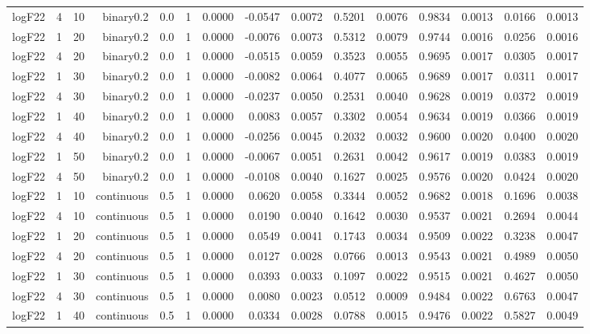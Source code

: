 \begin{longtable}{rrrrrrrrrrrrrrr}
  logF22 & 4 & 10 & binary0.2 & 0.0 & 1 & 0.0000 & -0.0547 & 0.0072 & 0.5201 & 0.0076 & 0.9834 & 0.0013 & 0.0166 & 0.0013 \\ 
  logF22 & 1 & 20 & binary0.2 & 0.0 & 1 & 0.0000 & -0.0076 & 0.0073 & 0.5312 & 0.0079 & 0.9744 & 0.0016 & 0.0256 & 0.0016 \\ 
  logF22 & 4 & 20 & binary0.2 & 0.0 & 1 & 0.0000 & -0.0515 & 0.0059 & 0.3523 & 0.0055 & 0.9695 & 0.0017 & 0.0305 & 0.0017 \\ 
  logF22 & 1 & 30 & binary0.2 & 0.0 & 1 & 0.0000 & -0.0082 & 0.0064 & 0.4077 & 0.0065 & 0.9689 & 0.0017 & 0.0311 & 0.0017 \\ 
  logF22 & 4 & 30 & binary0.2 & 0.0 & 1 & 0.0000 & -0.0237 & 0.0050 & 0.2531 & 0.0040 & 0.9628 & 0.0019 & 0.0372 & 0.0019 \\ 
  logF22 & 1 & 40 & binary0.2 & 0.0 & 1 & 0.0000 & 0.0083 & 0.0057 & 0.3302 & 0.0054 & 0.9634 & 0.0019 & 0.0366 & 0.0019 \\ 
  logF22 & 4 & 40 & binary0.2 & 0.0 & 1 & 0.0000 & -0.0256 & 0.0045 & 0.2032 & 0.0032 & 0.9600 & 0.0020 & 0.0400 & 0.0020 \\ 
  logF22 & 1 & 50 & binary0.2 & 0.0 & 1 & 0.0000 & -0.0067 & 0.0051 & 0.2631 & 0.0042 & 0.9617 & 0.0019 & 0.0383 & 0.0019 \\ 
  logF22 & 4 & 50 & binary0.2 & 0.0 & 1 & 0.0000 & -0.0108 & 0.0040 & 0.1627 & 0.0025 & 0.9576 & 0.0020 & 0.0424 & 0.0020 \\ 
  logF22 & 1 & 10 & continuous & 0.5 & 1 & 0.0000 & 0.0620 & 0.0058 & 0.3344 & 0.0052 & 0.9682 & 0.0018 & 0.1696 & 0.0038 \\ 
  logF22 & 4 & 10 & continuous & 0.5 & 1 & 0.0000 & 0.0190 & 0.0040 & 0.1642 & 0.0030 & 0.9537 & 0.0021 & 0.2694 & 0.0044 \\ 
  logF22 & 1 & 20 & continuous & 0.5 & 1 & 0.0000 & 0.0549 & 0.0041 & 0.1743 & 0.0034 & 0.9509 & 0.0022 & 0.3238 & 0.0047 \\ 
  logF22 & 4 & 20 & continuous & 0.5 & 1 & 0.0000 & 0.0127 & 0.0028 & 0.0766 & 0.0013 & 0.9543 & 0.0021 & 0.4989 & 0.0050 \\ 
  logF22 & 1 & 30 & continuous & 0.5 & 1 & 0.0000 & 0.0393 & 0.0033 & 0.1097 & 0.0022 & 0.9515 & 0.0021 & 0.4627 & 0.0050 \\ 
  logF22 & 4 & 30 & continuous & 0.5 & 1 & 0.0000 & 0.0080 & 0.0023 & 0.0512 & 0.0009 & 0.9484 & 0.0022 & 0.6763 & 0.0047 \\ 
  logF22 & 1 & 40 & continuous & 0.5 & 1 & 0.0000 & 0.0334 & 0.0028 & 0.0788 & 0.0015 & 0.9476 & 0.0022 & 0.5827 & 0.0049 \\ 

\end{longtable}
